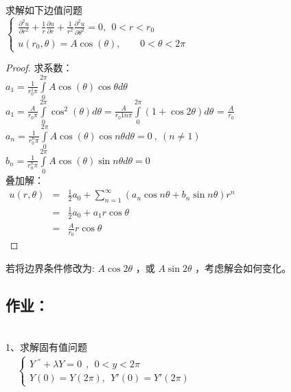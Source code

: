 \begin{example} %
	求解如下边值问题\\
	{ $  \displaystyle  \left \{ 
		\begin{array}{cc}
			\displaystyle {	\frac{\partial^2 u }{\partial r^2 } +\frac{1}{r } \frac{\partial u }{\partial r } +
				\frac{1}{r^2 } \frac{\partial ^2 u }{\partial \theta ^2
			} } =0, ~~ 0<r<r_0\\
			u(r_0,\theta )=A\cos(\theta),~~~~~~~~~ 0<\theta <2\pi 
		\end{array}
		\right. $}  
\end{example}
\begin{proof} 
	求系数：\\
  $  \displaystyle  a_1 = \frac{1}{r_0 ^1 \pi }  \int\limits_{0}^{2\pi} A\cos(\theta) \cos  \theta d\theta  $ \\ 	
    $  \displaystyle  a_1 = \frac{A}{r_0  \pi }  \int\limits_{0}^{2\pi} \cos ^2 (\theta)  d\theta  = \frac{A}{r_0 1n \pi }  \int\limits_{0}^{2\pi} (1+\cos2\theta) d\theta$ = $\frac{A}{r_0}$ \\ 
  $  \displaystyle  a_n = \frac{1}{r_0 ^n \pi }  \int\limits_{0}^{2\pi} A\cos(\theta) \cos n \theta d\theta =0~,~ (n\ne 1)$ \\ 
 $  \displaystyle  b_n = \frac{1}{r_0 ^n \pi }  \int\limits_{0}^{2\pi} A\cos(\theta) \sin n \theta d\theta =0 $  \\ 
叠加解：\\
	$\begin{array}{llll}
	u(r, \theta) &=& \frac{1}{2} a_0 +\sum_{n=1}^{\infty } (a_n\cos n\theta +b_n \sin n \theta ) r^n \\
	                   &=& \frac{1}{2} a_0+ a_1 r\cos \theta \\
	                   &=&  \frac{A}{r_0} r \cos \theta 
\end{array}$ \\ 
\end{proof} 

\begin{remark}
若将边界条件修改为: $A \cos 2\theta$ ，或 $A \sin 2\theta $ ，考虑解会如何变化。
\end{remark}

\subsection{作业：}
~~~\hspace*{\fill} \\
1、求解固有值问题\\ 
	$\begin{array}{lllllllll}
	& \begin{cases}
		Y~^{''} +\lambda Y=0  ~~,~~ 0<y<2\pi \\
        Y(0) =Y(2\pi) , ~~ Y'(0) =Y'(2\pi)
	    \end{cases}\\	
\end{array}$ \\ 

